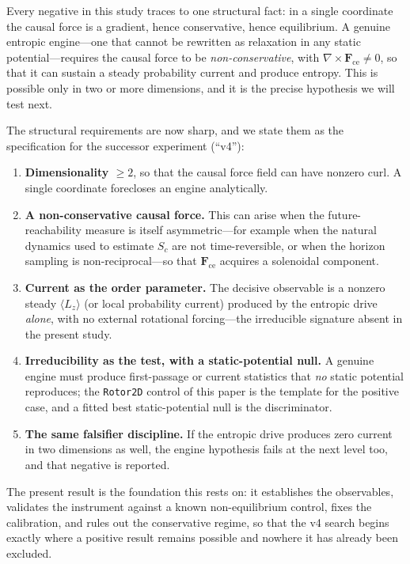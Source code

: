 \documentclass[11pt]{article}
\begin{document}
Every negative in this study traces to one structural fact: in a single coordinate the causal force is a gradient, hence conservative, hence equilibrium. A genuine entropic engine---one that cannot be rewritten as relaxation in any static potential---requires the causal force to be \emph{non-conservative}, with $\nabla\times\mathbf{F}_{\text{ce}}\neq 0$, so that it can sustain a steady probability current and produce entropy. This is possible only in two or more dimensions, and it is the precise hypothesis we will test next.

The structural requirements are now sharp, and we state them as the specification for the successor experiment (``v4''):
\begin{enumerate}
\item \textbf{Dimensionality $\geq 2$}, so that the causal force field can have nonzero curl. A single coordinate forecloses an engine analytically.
\item \textbf{A non-conservative causal force.} This can arise when the future-reachability measure is itself asymmetric---for example when the natural dynamics used to estimate $S_c$ are not time-reversible, or when the horizon sampling is non-reciprocal---so that $\mathbf{F}_{\text{ce}}$ acquires a solenoidal component.
\item \textbf{Current as the order parameter.} The decisive observable is a nonzero steady $\langle L_z\rangle$ (or local probability current) produced by the entropic drive \emph{alone}, with no external rotational forcing---the irreducible signature absent in the present study.
\item \textbf{Irreducibility as the test, with a static-potential null.} A genuine engine must produce first-passage or current statistics that \emph{no} static potential reproduces; the \texttt{Rotor2D} control of this paper is the template for the positive case, and a fitted best static-potential null is the discriminator.
\item \textbf{The same falsifier discipline.} If the entropic drive produces zero current in two dimensions as well, the engine hypothesis fails at the next level too, and that negative is reported.
\end{enumerate}

The present result is the foundation this rests on: it establishes the observables, validates the instrument against a known non-equilibrium control, fixes the calibration, and rules out the conservative regime, so that the v4 search begins exactly where a positive result remains possible and nowhere it has already been excluded.
\end{document}
